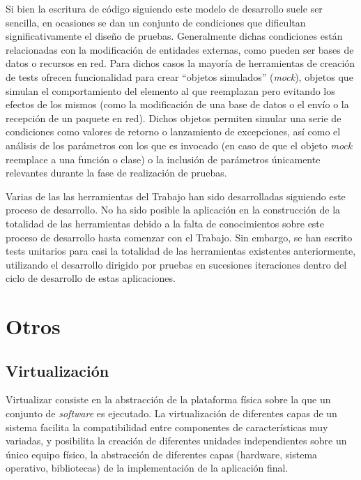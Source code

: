Si bien la escritura de código siguiendo este modelo de desarrollo suele ser sencilla, en ocasiones se dan un conjunto de condiciones que dificultan significativamente el diseño de pruebas. Generalmente dichas condiciones están relacionadas con la modificación de entidades externas, como pueden ser bases de datos o recursos en red. Para dichos casos la mayoría de herramientas de creación de tests ofrecen funcionalidad para crear ``objetos simulados'' (\textit{mock}), objetos que simulan el comportamiento del elemento al que reemplazan pero evitando los efectos de los mismos (como la modificación de una base de datos o el envío o la recepción de un paquete en red). Dichos objetos permiten simular una serie de condiciones como valores de retorno o lanzamiento de excepciones, así como el análisis de los parámetros con los que es invocado (en caso de que el objeto \textit{mock} reemplace a una función o clase) o la inclusión de parámetros únicamente relevantes durante la fase de realización de pruebas.


Varias de las las herramientas del Trabajo han sido desarrolladas siguiendo este proceso de desarrollo. No ha sido posible la aplicación en la construcción de la totalidad de las herramientas debido a la falta de conocimientos sobre este proceso de desarrollo hasta comenzar con el Trabajo. Sin embargo, se han escrito tests unitarios para casi la totalidad de las herramientas existentes anteriormente, utilizando el desarrollo dirigido por pruebas en sucesiones iteraciones dentro del ciclo de desarrollo de estas aplicaciones.


\section{Otros}

\subsection{Virtualización}
\label{teoria:virtualizacion}

Virtualizar consiste en la abstracción de la plataforma física sobre la que un conjunto de \textit{software} es ejecutado. La virtualización de diferentes capas de un sistema facilita la compatibilidad entre componentes de características muy variadas, y posibilita la creación de diferentes unidades independientes sobre un único equipo físico, la abstracción de diferentes capas (hardware, sistema operativo, bibliotecas) de la implementación de la aplicación final.

